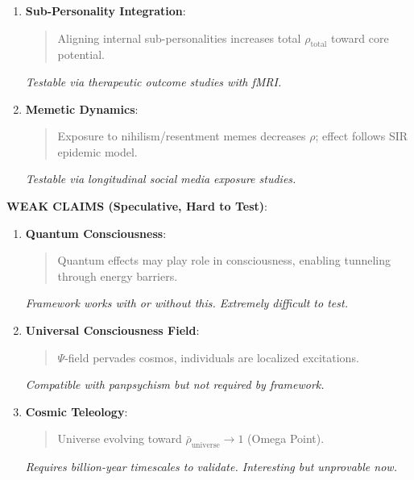 \documentclass[11pt,a4paper]{article}
\theoremstyle{definition}
\theoremstyle{remark}
\begin{document}
\begin{enumerate}
\begin{protocol}
\begin{mdframed}[backgroundcolor=yellow!10,linewidth=2pt]
\begin{enumerate}
    \item \textbf{Sub-Personality Integration}:
        \begin{quote}
        Aligning internal sub-personalities increases total \(\rho_{\text{total}}\) toward core potential.
        \end{quote}
        \textit{Testable via therapeutic outcome studies with fMRI.}
    
    \item \textbf{Memetic Dynamics}:
        \begin{quote}
        Exposure to nihilism/resentment memes decreases \(\rho\); effect follows SIR epidemic model.
        \end{quote}
        \textit{Testable via longitudinal social media exposure studies.}
\end{enumerate}

\textbf{WEAK CLAIMS (Speculative, Hard to Test)}:

\begin{enumerate}
    \item \textbf{Quantum Consciousness}:
        \begin{quote}
        Quantum effects may play role in consciousness, enabling tunneling through energy barriers.
        \end{quote}
        \textit{Framework works with or without this. Extremely difficult to test.}
    
    \item \textbf{Universal Consciousness Field}:
        \begin{quote}
        \(\Psi\)-field pervades cosmos, individuals are localized excitations.
        \end{quote}
        \textit{Compatible with panpsychism but not required by framework.}
    
    \item \textbf{Cosmic Teleology}:
        \begin{quote}
        Universe evolving toward \(\bar{\rho}_{\text{universe}} \to 1\) (Omega Point).
        \end{quote}
        \textit{Requires billion-year timescales to validate. Interesting but unprovable now.}
\end{enumerate}


\end{mdframed}
\end{protocol}
\end{enumerate}
\end{document}
